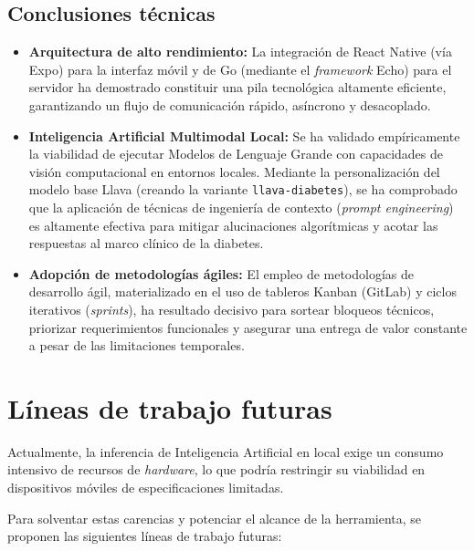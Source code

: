 \subsection{Conclusiones técnicas}
\begin{itemize}
    \item \textbf{Arquitectura de alto rendimiento:} La integración de React Native (vía Expo) para la interfaz móvil y de Go (mediante el \textit{framework} Echo) para el servidor ha demostrado constituir una pila tecnológica altamente eficiente, garantizando un flujo de comunicación rápido, asíncrono y desacoplado.
    \item \textbf{Inteligencia Artificial Multimodal Local:} Se ha validado empíricamente la viabilidad de ejecutar Modelos de Lenguaje Grande con capacidades de visión computacional en entornos locales. Mediante la personalización del modelo base Llava (creando la variante \texttt{llava-diabetes}), se ha comprobado que la aplicación de técnicas de ingeniería de contexto (\textit{prompt engineering}) es altamente efectiva para mitigar alucinaciones algorítmicas y acotar las respuestas al marco clínico de la diabetes.
    \item \textbf{Adopción de metodologías ágiles:} El empleo de metodologías de desarrollo ágil, materializado en el uso de tableros Kanban (GitLab) y ciclos iterativos (\textit{sprints}), ha resultado decisivo para sortear bloqueos técnicos, priorizar requerimientos funcionales y asegurar una entrega de valor constante a pesar de las limitaciones temporales.
\end{itemize}

\section{Líneas de trabajo futuras}

Actualmente, la inferencia de Inteligencia Artificial en local exige un consumo intensivo de recursos de \textit{hardware}, lo que podría restringir su viabilidad en dispositivos móviles de especificaciones limitadas.

Para solventar estas carencias y potenciar el alcance de la herramienta, se proponen las siguientes líneas de trabajo futuras:

